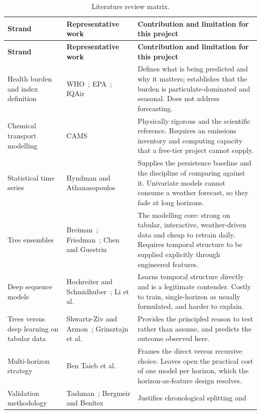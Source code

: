 \begin{xltabular}{\textwidth}{P{2.9cm} P{3.4cm} Y}
\caption{Literature review matrix.}\label{tab:litmatrix}\\
\toprule
\bfseries Strand & \bfseries Representative work & \bfseries Contribution and limitation for this project \\
\midrule
\endfirsthead
\toprule
\bfseries Strand & \bfseries Representative work & \bfseries Contribution and limitation for this project \\
\midrule
\endhead
\bottomrule
\endlastfoot
Health burden and index definition & WHO~\cite{ref:who}; EPA~\cite{ref:epa};
IQAir~\cite{ref:iqair} & Defines what is being predicted and why it matters; establishes
that the burden is particulate-dominated and seasonal. Does not address forecasting. \\
Chemical transport modelling & CAMS~\cite{ref:cams} & Physically rigorous and the
scientific reference. Requires an emissions inventory and computing capacity that a
free-tier project cannot supply. \\
Statistical time series & Hyndman and Athanasopoulos~\cite{ref:fpp} & Supplies the
persistence baseline and the discipline of comparing against it. Univariate models cannot
consume a weather forecast, so they fade at long horizons. \\
Tree ensembles & Breiman~\cite{ref:rf}; Friedman~\cite{ref:gb};
Chen and Guestrin~\cite{ref:xgboost} & The modelling core: strong on tabular,
interactive, weather-driven data and cheap to retrain daily. Requires temporal
structure to be supplied explicitly through engineered features. \\
Deep sequence models & Hochreiter and Schmidhuber~\cite{ref:lstm};
Li et al.~\cite{ref:lstmpm} & Learns temporal structure directly and is a legitimate
contender. Costly to train, single-horizon as usually formulated, and harder to explain. \\
Trees versus deep learning on tabular data & Shwartz-Ziv and
Armon~\cite{ref:tabnotall}; Grinsztajn et al.~\cite{ref:whytrees} & Provides the
principled reason to test rather than assume, and predicts the outcome observed here. \\
Multi-horizon strategy & Ben Taieb et al.~\cite{ref:multistep} & Frames the direct versus
recursive choice. Leaves open the practical cost of one model per horizon, which the
horizon-as-feature design resolves. \\
Validation methodology & Tashman~\cite{ref:tashman};
Bergmeir and Benítez~\cite{ref:bergmeir} & Justifies chronological splitting and

\end{xltabular}
